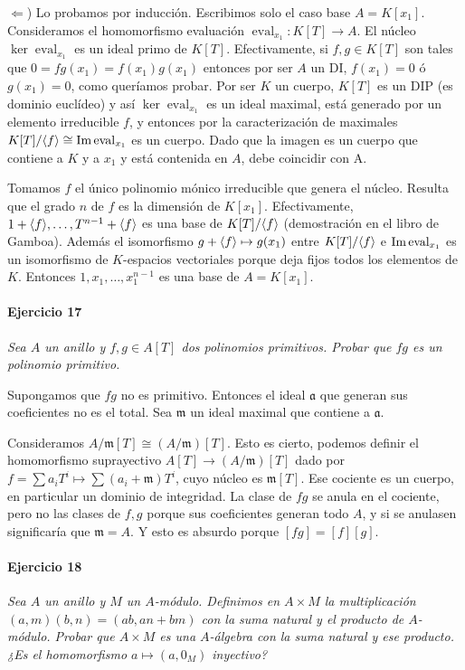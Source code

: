 \documentclass[../main.tex]{subfiles}
\begin{document}
$\Leftarrow$) Lo probamos por inducción. Escribimos solo el caso base $A=K[x_1]$. Consideramos el homomorfismo evaluación $\operatorname{eval}_{x_1}:K[T]\to A$. El núcleo $\ker \operatorname{eval}_{x_1}$ es un ideal primo de $K[T]$. Efectivamente, si $f, g \in K[T]$ son tales que $0 = fg (x_1) = f(x_1)g(x_1)$ entonces por ser $A$ un DI, $f(x_1)=0$ ó $g(x_1) = 0$, como queríamos probar. Por ser $K$ un cuerpo, $K[T]$ es un DIP (es dominio euclídeo) y así $\ker \operatorname{eval}_{x_1}$ es un ideal maximal, está generado por un elemento irreducible $f$, y entonces por la caracterización de maximales $K[T]/\langle f \rangle \cong \text{Im} \operatorname{eval}_{x_1}$ es un cuerpo. Dado que la imagen es un cuerpo que contiene a $K$ y a $x_1$ y está contenida en $A$, debe coincidir con A.

Tomamos $f$ el único polinomio mónico irreducible que genera el núcleo. Resulta que el grado  $n$ de $f$ es la dimensión de $K[x_1]$. Efectivamente, $1+\langle f \rangle, \dots, T^{n-1}+\langle f \rangle$ es una base de $K[T]/\langle f \rangle$ (demostración en el libro de Gamboa). Además el isomorfismo $g+\langle f \rangle \mapsto g(x_1)$ entre $K[T]/\langle f \rangle$ e $\text{Im} \operatorname{eval}_{x_1}$ es un isomorfismo de $K$-espacios vectoriales porque deja fijos todos los elementos de $K$. Entonces $1, x_1, \ldots, x_1^{n-1}$ es una base de $A=K[x_1]$.

\paragraph{Ejercicio 17} \textit{Sea $A$ un anillo y $f, g\in A[T]$ dos polinomios primitivos. Probar que $fg$ es un polinomio primitivo.}

Supongamos que $fg$ no es primitivo. Entonces el ideal $\mathfrak a$ que generan sus coeficientes no es el total. Sea $\mathfrak m$ un ideal maximal que contiene a $\mathfrak a$.

Consideramos $A/\mathfrak m [T] \cong (A/\mathfrak m)[T]$. Esto es cierto, podemos definir el homomorfismo suprayectivo $A[T] \to (A/\mathfrak m)[T]$ dado por $f= \sum a_iT^i \mapsto \sum (a_i+\mathfrak m) T^i$, cuyo núcleo es $\mathfrak m[T]$. Ese cociente es un cuerpo, en particular un dominio de integridad. La clase de $fg$ se anula en el cociente, pero no las clases de $f, g$ porque sus coeficientes generan todo $A$, y si se anulasen significaría que $\mathfrak m = A$. Y esto es absurdo porque $[fg] = [f][g]$.

\paragraph{Ejercicio 18} \textit{Sea $A$ un anillo y $M$ un $A$-módulo. Definimos en $A\times M$ la multiplicación $(a,m)(b,n) = (ab,an+bm)$ con la suma natural y el producto de $A$-módulo. Probar que $A\times M$ es una $A$-álgebra con la suma natural y ese producto. ¿Es el homomorfismo $a\mapsto (a,0_M)$ inyectivo?}
\end{document}
